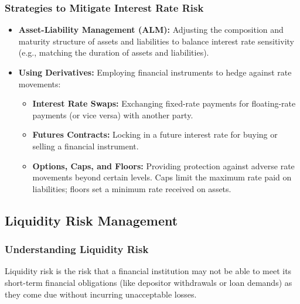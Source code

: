 \subsubsection{Strategies to Mitigate Interest Rate Risk}
\begin{itemize}
    \item \textbf{Asset-Liability Management (ALM):} Adjusting the composition and maturity structure of assets and liabilities to balance interest rate sensitivity (e.g., matching the duration of assets and liabilities).
    \item \textbf{Using Derivatives:} Employing financial instruments to hedge against rate movements:
        \begin{itemize}
            \item \textbf{Interest Rate Swaps:} Exchanging fixed-rate payments for floating-rate payments (or vice versa) with another party.
            \item \textbf{Futures Contracts:} Locking in a future interest rate for buying or selling a financial instrument.
            \item \textbf{Options, Caps, and Floors:} Providing protection against adverse rate movements beyond certain levels. Caps limit the maximum rate paid on liabilities; floors set a minimum rate received on assets.
        \end{itemize}
\end{itemize}

\subsection{Liquidity Risk Management}

\subsubsection{Understanding Liquidity Risk}
Liquidity risk is the risk that a financial institution may not be able to meet its short-term financial obligations (like depositor withdrawals or loan demands) as they come due without incurring unacceptable losses.


